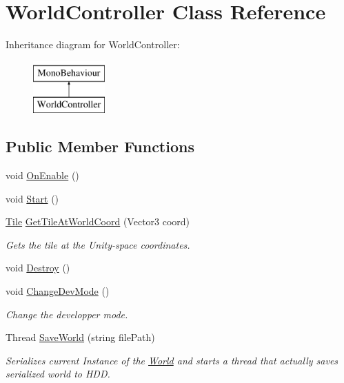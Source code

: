 \hypertarget{class_world_controller}{}\section{World\+Controller Class Reference}
\label{class_world_controller}
Inheritance diagram for World\+Controller\+:\begin{figure}[H]
\begin{center}
\leavevmode
\includegraphics[height=2.000000cm]{class_world_controller}
\end{center}
\end{figure}
\subsection*{Public Member Functions}
\begin{DoxyCompactItemize}
\item 
void \hyperlink{class_world_controller_af9220149f50513fb0f7053cb3864da03}{On\+Enable} ()
\item 
void \hyperlink{class_world_controller_a75c2c9eb9749acbc48ba5d74d101f3ba}{Start} ()
\item 
\hyperlink{class_tile}{Tile} \hyperlink{class_world_controller_ad2ac06d87936d4b4cdaab4bef1107feb}{Get\+Tile\+At\+World\+Coord} (Vector3 coord)
\begin{DoxyCompactList}\small\item\em Gets the tile at the Unity-\/space coordinates. \end{DoxyCompactList}\item 
void \hyperlink{class_world_controller_aada59737c9d351025ec763d0a7a870a8}{Destroy} ()
\item 
void \hyperlink{class_world_controller_af59950c2a931c2201d6f3cec898b90c5}{Change\+Dev\+Mode} ()
\begin{DoxyCompactList}\small\item\em Change the developper mode. \end{DoxyCompactList}\item 
Thread \hyperlink{class_world_controller_a87cc9f9a785201e40d14e30ab359a99a}{Save\+World} (string file\+Path)
\begin{DoxyCompactList}\small\item\em Serializes current Instance of the \hyperlink{class_world}{World} and starts a thread that actually saves serialized world to H\+DD. \end{DoxyCompactList}\end{DoxyCompactItemize}
